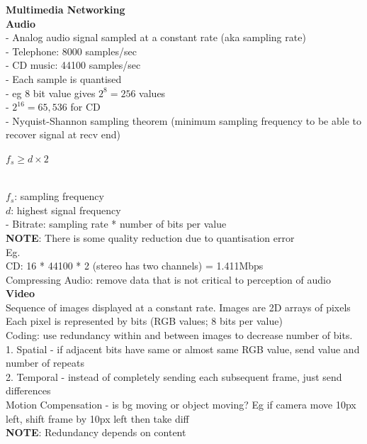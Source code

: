 \documentclass[10pt, a4paper]{article}
\newcommand{\highlight}[1]{{\color{red}\textbf{#1}}}
\newcommand{\blue}[1]{{\color{MidnightBlue}#1}}
\newcommand{\red}[1]{{\color{red}#1}}
\newcommand{\tab}[0]{\hspace*{2mm}}
\begin{document}
\begin{multicols*}{3}
		{\normalsize\textbf{Multimedia Networking}}\\

		\textbf{Audio}\\
		- Analog audio signal sampled at a constant rate (aka sampling rate)\\
		\tab - Telephone: 8000 samples/sec\\
		\tab - CD music: 44100 samples/sec\\
		- Each sample is quantised\\
		\tab - eg 8 bit value gives $2^{8}=256$ values\\
		\tab - $2^{16} =65,536$ for CD\\
		- Nyquist-Shannon sampling theorem (minimum sampling frequency to be able to recover signal at recv end)\\
		\centerline{$f_{s} \geq d \times 2$}\\
		\tab $f_{s}$: sampling frequency\\
		\tab $d$: highest signal frequency\\
		- Bitrate: sampling rate * number of bits per value\\
		\highlight{NOTE}: There is some quality reduction due to quantisation error\\
		Eg.\\
		CD: 16 * 44100 * 2 (stereo has two channels) = 1.411Mbps\\
		Compressing Audio: remove data that is not critical to perception of audio\\

		\textbf{Video}\\
		\blue{Sequence of images} displayed at a constant rate. Images are 2D arrays of pixels\\
		Each pixel is represented by bits (RGB values; 8 bits per value)\\
		Coding: use redundancy \red{within} and \red{between} images to decrease number of bits.\\
		1. Spatial - if adjacent bits have same or almost same RGB value, send \red{value and number of repeats}\\
		2. Temporal - instead of completely sending each subsequent frame, just send \red{differences}\\
		Motion Compensation - is bg moving or object moving? Eg if camera move 10px left, shift frame by 10px left then take diff\\
		\highlight{NOTE}: Redundancy depends on content\\


\end{multicols*}
\end{document}
